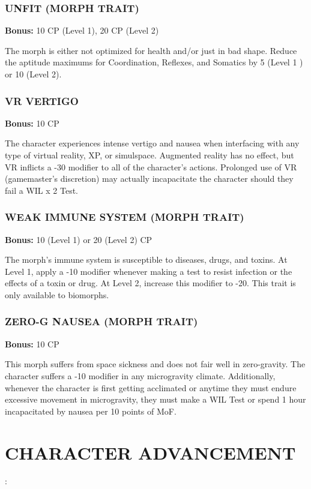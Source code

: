\subsubsection{UNFIT (MORPH TRAIT)}
\textbf{Bonus:} 10 CP (Level 1), 20 CP (Level 2)

The morph is either not optimized for health and/or just in bad shape. Reduce
the aptitude maximums for Coordination, Reflexes, and Somatics by 5 (Level 1 )
or 10 (Level 2).

\subsubsection{VR VERTIGO}
\textbf{Bonus:} 10 CP

The character experiences intense vertigo and nausea when interfacing with any
type of virtual reality, XP, or simulspace. Augmented reality has no effect,
but VR inflicts a -30 modifier to all of the character’s actions. Prolonged use
of VR (gamemaster’s discretion) may actually incapacitate the character
should they fail a WIL x 2 Test.

\subsubsection{WEAK IMMUNE SYSTEM (MORPH TRAIT)}
\textbf{Bonus:} 10 (Level 1) or 20 (Level 2) CP

The morph’s immune system is susceptible to diseases, drugs, and toxins. At
Level 1, apply a -10 modifier whenever making a test to resist infection or the
effects of a toxin or drug. At Level 2, increase this modifier to -20. This
trait is only available to biomorphs.

\subsubsection{ZERO-G NAUSEA (MORPH TRAIT)}
\textbf{Bonus:} 10 CP

This morph suffers from space sickness and does not fair well in
zero-gravity. The character suffers a -10 modifier in any microgravity
climate. Additionally, whenever the character is first getting acclimated or
anytime they must endure excessive movement in microgravity, they must make a
WIL Test or spend 1 hour incapacitated by nausea per 10 points of MoF.

\section{CHARACTER ADVANCEMENT}:

